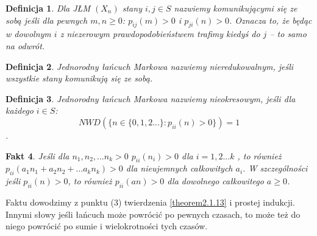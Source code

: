 \documentclass[a4paper]{article}
\theoremstyle{defn}
\newtheorem{defn}{Definicja}[subsection]
\theoremstyle{theorem}
\theoremstyle{lemma}
\theoremstyle{cor}
\theoremstyle{fact}
\newtheorem{fact}[defn]{Fakt}
\begin{document}
\begin{defn}\label{defn2.1.15}
Dla JŁM $(X_n)$ stany $i,j \in S$ nazwiemy \textit{komunikującymi się ze sobą} jeśli dla pewnych $m,n \geq 0$: $p_{ij}(m) > 0$ i $p_{ji}(n) > 0$.
Oznacza to, że będąc w dowolnym $i$ z niezerowym prawdopodobieństwem trafimy kiedyś do $j$ – to samo na odwrót.
\end{defn}
\begin{defn}\label{defn2.1.16}
Jednorodny łańcuch Markowa nazwiemy nieredukowalnym, jeśli wszystkie stany komunikują się ze sobą.
\end{defn}
\begin{defn}\label{defn2.1.17}
Jednorodny łańcuch Markowa nazwiemy nieokresowym, jeśli dla każdego $i \in S$: $$NWD(\{n \in \{0, 1, 2...\}:  p_{ii}(n) > 0\}) = 1$$.
\end{defn}
\begin{fact}\label{fact2.1.18}
Jeśli dla $n_1, n_2, ... n_k > 0$ $p_{ii}(n_i) > 0$ dla $i=1,2...k$ , to również $p_{ii}(a_1n_1 + a_2n_2 + ... a_kn_k) > 0$ dla nieujemnych całkowitych $a_i$. W szczególności jeśli $p_{ii}(n) > 0$, to również $p_{ii}(an) > 0$ dla dowolnego całkowitego $a \geq 0$.
\end{fact}
Faktu dowodzimy z punktu (3) twierdzenia \ref{theorem2.1.13} i prostej indukcji. Innymi słowy jeśli łańcuch może powrócić po pewnych czasach, to może też do niego powrócić po sumie i wielokrotności tych czasów.
\end{document}
